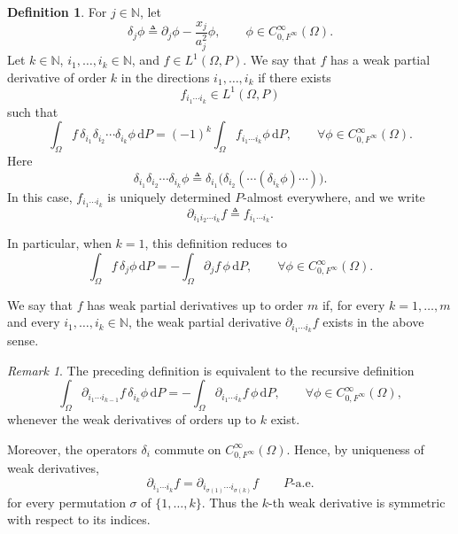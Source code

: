 \documentclass[12pt]{article}
\theoremstyle{plain}
\newtheorem{lemma}[theorem]{Lemma}
\theoremstyle{definition}
\newtheorem{definition}[theorem]{Definition}
\theoremstyle{remark}
\newtheorem{remark}[theorem]{Remark}
\numberwithin{equation}{section}
\newcommand{\nn}{\mathbb{N}}
\begin{document}
\begin{definition}
For $j\in\mathbb{N}$, let  
$$
\delta_j\phi \triangleq \partial_j\phi-\frac{x_j}{a_j^2}\phi,
\qquad \phi\in C_{0,F^\infty}^{\infty}(\Omega).
$$  
Let $k\in\mathbb{N}$, $i_1,\ldots,i_k\in\mathbb{N}$, and $f\in L^1(\Omega,P)$. We say that $f$ has a weak partial derivative of order $k$ in the directions $i_1,\ldots,i_k$ if there exists  
$$
f_{i_1\cdots i_k}\in L^1(\Omega,P)
$$  
such that  
$$
\int_{\Omega}
f\,
\delta_{i_1}\delta_{i_2}\cdots\delta_{i_k}\phi
\,\mathrm dP
=
(-1)^k
\int_{\Omega}
f_{i_1\cdots i_k}\phi
\,\mathrm dP,
\qquad
\forall\phi\in C_{0,F^\infty}^{\infty}(\Omega).
$$  
Here  
$$
\delta_{i_1}\delta_{i_2}\cdots\delta_{i_k}\phi
\triangleq
\delta_{i_1}\bigl(
\delta_{i_2}(\cdots(\delta_{i_k}\phi)\cdots)
\bigr).
$$  
In this case, $f_{i_1\cdots i_k}$ is uniquely determined $P$-almost everywhere, and we write  
$$
\partial_{i_1i_2\cdots i_k}f
\triangleq
f_{i_1\cdots i_k}.
$$

In particular, when $k=1$, this definition reduces to  
$$
\int_{\Omega}
f\,\delta_j\phi\,\mathrm dP
=
-\int_{\Omega}
\partial_j f\,\phi\,\mathrm dP,
\qquad
\forall\phi\in C_{0,F^\infty}^{\infty}(\Omega).
$$

We say that $f$ has weak partial derivatives up to order $m$ if, for every $k=1,\ldots,m$ and every $i_1,\ldots,i_k\in\mathbb{N}$, the weak partial derivative $\partial_{i_1\cdots i_k}f$ exists in the above sense.
\end{definition}

\begin{remark}
The preceding definition is equivalent to the recursive definition  
$$
\int_{\Omega}
\partial_{i_1\cdots i_{k-1}}f\,
\delta_{i_k}\phi
\,\mathrm dP
=
-\int_{\Omega}
\partial_{i_1\cdots i_k}f\,
\phi
\,\mathrm dP,
\qquad
\forall\phi\in C_{0,F^\infty}^{\infty}(\Omega),
$$  
whenever the weak derivatives of orders up to $k$ exist.

Moreover, the operators $\delta_i$ commute on $C_{0,F^\infty}^{\infty}(\Omega)$. Hence, by uniqueness of weak derivatives,  
$$
\partial_{i_1\cdots i_k}f
=
\partial_{i_{\sigma(1)}\cdots i_{\sigma(k)}}f
\qquad P\text{-a.e.}
$$  
for every permutation $\sigma$ of $\{1,\ldots,k\}$.  
Thus the $k$-th weak derivative is symmetric with respect to its indices.
\end{remark}

\end{document}
